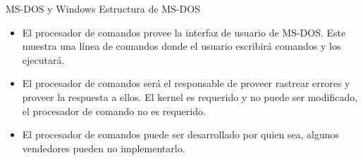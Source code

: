 \documentclass[11pt]{beamer}
\begin{document}
		\begin{frame}{MS-DOS y Windows}
			Estructura de MS-DOS
			\begin{itemize}
				\item El procesador de comandos provee la interfaz de usuario de MS-DOS. Este muestra una línea de comandos donde el usuario escribirá comandos y los ejecutará.
				\item El procesador de comandos será el responsable de proveer rastrear errores y proveer la respuesta a ellos. El kernel es requerido y no puede ser modificado, el procesador de comando no es requerido.
				\item El procesador de comandos puede ser desarrollado por quien sea, algunos vendedores pueden no implementarlo.
			\end{itemize}
		\end{frame}		
\end{document}
